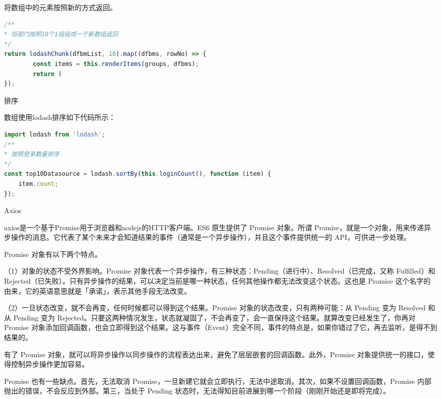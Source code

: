 \documentclass[12pt]{book}
\makeatletter
\numberwithin{dummy}{section}
\theoremstyle{ocrenumbox}
\theoremstyle{blacknumex}
\theoremstyle{blacknumbox}
\theoremstyle{ocrenum}
\renewcommand{\subsection}{\@startsection {subsection}{2}{\z@}
	{-3ex \@plus -0.1ex \@minus -.4ex}
	{0.5ex \@plus.2ex }
	{\normalfont\sffamily\bfseries}}
\renewcommand\paragraph{\@startsection{paragraph}{4}{\z@}
	{-2ex \@plus-.2ex \@minus .2ex}
	{.1ex}
	{\normalfont\small\sffamily\bfseries}}
\makeatother
\begin{document}
将数组中的元素按照新的方式返回。

\begin{lstlisting}[language=JavaScript]
/**
* 将部门按照10个1组组成一个新数组返回
*/
return lodashChunk(dfbmList, 10).map((dfbms, rowNo) => {
		const items = this.renderItems(groups, dfbms);
		return (
});
\end{lstlisting}

\paragraph{排序}

数组使用lodash排序如下代码所示：

\begin{lstlisting}[language=JavaScript]
import lodash from 'lodash';
/**
* 按照登录数量排序
*/
const top10Datasource = lodash.sortBy(this.loginCount(), function (item) {
	item.count;
});
\end{lstlisting}

\subsection{Axios}

axios是一个基于Promise用于浏览器和nodejs的HTTP客户端。ES6 原生提供了 Promise 对象。所谓 Promise，就是一个对象，用来传递异步操作的消息。它代表了某个未来才会知道结果的事件（通常是一个异步操作），并且这个事件提供统一的 API，可供进一步处理。

Promise 对象有以下两个特点。

（1）对象的状态不受外界影响。Promise 对象代表一个异步操作，有三种状态：Pending（进行中）、Resolved（已完成，又称 Fulfilled）和 Rejected（已失败）。只有异步操作的结果，可以决定当前是哪一种状态，任何其他操作都无法改变这个状态。这也是 Promise 这个名字的由来，它的英语意思就是「承诺」，表示其他手段无法改变。

（2）一旦状态改变，就不会再变，任何时候都可以得到这个结果。Promise 对象的状态改变，只有两种可能：从 Pending 变为 Resolved 和从 Pending 变为 Rejected。只要这两种情况发生，状态就凝固了，不会再变了，会一直保持这个结果。就算改变已经发生了，你再对 Promise 对象添加回调函数，也会立即得到这个结果。这与事件（Event）完全不同，事件的特点是，如果你错过了它，再去监听，是得不到结果的。

有了 Promise 对象，就可以将异步操作以同步操作的流程表达出来，避免了层层嵌套的回调函数。此外，Promise 对象提供统一的接口，使得控制异步操作更加容易。

Promise 也有一些缺点。首先，无法取消 Promise，一旦新建它就会立即执行，无法中途取消。其次，如果不设置回调函数，Promise 内部抛出的错误，不会反应到外部。第三，当处于 Pending 状态时，无法得知目前进展到哪一个阶段（刚刚开始还是即将完成）。
\end{document}
